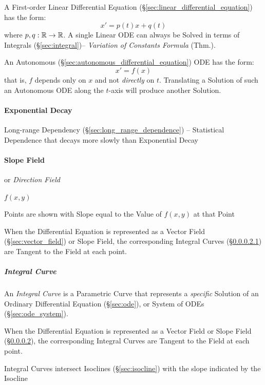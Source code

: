 {A First-order Linear Differential Equation
(\S\ref{sec:linear_differential_equation}) has the form:
\[
  x' = p(t)x + q(t)
\]
where $p, q: \mathbb{R} \rightarrow \mathbb{R}$.
A single Linear ODE can always be Solved in terms of Integrals
(\S\ref{sec:integral})-- \emph{Variation of Constants Formula} (Thm.).

An Autonomous (\S\ref{sec:autonomous_differential_equation}) ODE has the form:
\[
  x' = f(x)
\]
that is, $f$ depends only on $x$ and not \emph{directly} on $t$. Translating a
Solution of such an Autonomous ODE along the $t$-axis will produce another
Solution.



\paragraph{Exponential Decay}\label{sec:exponential_decay}\hfill


\fist Long-range Dependency (\S\ref{sec:long_range_dependence}) -- Statistical
Dependence that decays more slowly than Exponential Decay



\paragraph{Slope Field}\label{sec:slope_field}\hfill

or \emph{Direction Field}

$f(x,y)$

Points are shown with Slope equal to the Value of $f(x,y)$ at that Point

When the Differential Equation is represented as a Vector Field
(\S\ref{sec:vector_field}) or Slope Field, the corresponding Integral Curves
(\S\ref{sec:integral_curve}) are Tangent to the Field at each point.



\subparagraph{Integral Curve}\label{sec:integral_curve}\hfill

An \emph{Integral Curve} is a Parametric Curve that represents a
\emph{specific} Solution of an Ordinary Differential Equation
(\S\ref{sec:ode}), or System of ODEs (\S\ref{sec:ode_system}).

When the Differential Equation is represented as a Vector Field or Slope Field
(\S\ref{sec:slope_field}), the corresponding Integral Curves are Tangent to the
Field at each point.

Integral Curves intersect Isoclines (\S\ref{sec:isocline}) with the slope
indicated by the Isocline

}

